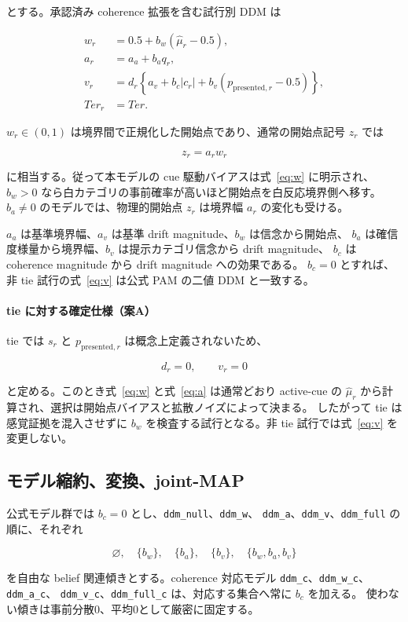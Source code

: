 \documentclass[11pt]{ltjsarticle}
\newcommand{\code}[1]{\texttt{#1}}
\begin{document}
とする。承認済み coherence 拡張を含む試行別 DDM は

\begin{align}
w_r &=0.5+b_w(\hat\mu_r-0.5),\label{eq:w}\\
a_r &=a_a+b_a q_r,\label{eq:a}\\
v_r &=d_r\left\{a_v+b_c|c_r|
       +b_v(p_{\mathrm{presented},r}-0.5)\right\},\label{eq:v}\\
Ter_r&=Ter.\label{eq:ter}
\end{align}

\(w_r\in(0,1)\) は境界間で正規化した開始点であり、通常の開始点記号 \(z_r\) では

\[
z_r=a_r w_r
\]

に相当する。従って本モデルの cue 駆動バイアスは式~\eqref{eq:w} に明示され、
\(b_w>0\) なら白カテゴリの事前確率が高いほど開始点を白反応境界側へ移す。
\(b_a\neq0\) のモデルでは、物理的開始点 \(z_r\) は境界幅 \(a_r\) の変化も受ける。

\(a_a\) は基準境界幅、\(a_v\) は基準 drift magnitude、\(b_w\) は信念から開始点、
\(b_a\) は確信度様量から境界幅、\(b_v\) は提示カテゴリ信念から drift magnitude、
\(b_c\) は coherence magnitude から drift magnitude への効果である。
\(b_c=0\) とすれば、非 tie 試行の式~\eqref{eq:v} は公式 PAM の二値 DDM と一致する。

\paragraph{tie に対する確定仕様（案A）}
tie では \(s_r\) と \(p_{\mathrm{presented},r}\) は概念上定義されないため、

\[
d_r=0,
\qquad
v_r=0
\]

と定める。このとき式~\eqref{eq:w} と式~\eqref{eq:a} は通常どおり active-cue の
\(\hat\mu_r\) から計算され、選択は開始点バイアスと拡散ノイズによって決まる。
したがって tie は感覚証拠を混入させずに \(b_w\) を検査する試行となる。非 tie
試行では式~\eqref{eq:v} を変更しない。

\subsection{モデル縮約、変換、joint-MAP}

公式モデル群では \(b_c=0\) とし、\code{ddm\_null}、\code{ddm\_w}、
\code{ddm\_a}、\code{ddm\_v}、\code{ddm\_full} の順に、それぞれ

\[
\varnothing,\quad \{b_w\},\quad \{b_a\},\quad \{b_v\},\quad
\{b_w,b_a,b_v\}
\]

を自由な belief 関連傾きとする。coherence 対応モデル
\code{ddm\_c}、\code{ddm\_w\_c}、\code{ddm\_a\_c}、
\code{ddm\_v\_c}、\code{ddm\_full\_c} は、対応する集合へ常に \(b_c\) を加える。
使わない傾きは事前分散0、平均0として厳密に固定する。
\end{document}
